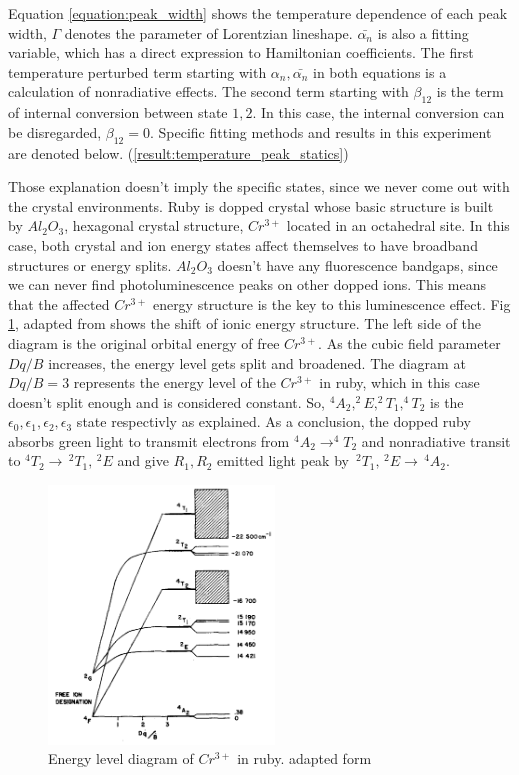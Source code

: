 \documentclass{article}
\begin{document}
 Equation \ref{equation:peak_width} shows the temperature dependence of each peak width, $\Gamma$ denotes the parameter of Lorentzian lineshape.
 $\bar{\alpha_n}$ is also a fitting variable, which has a direct expression to Hamiltonian coefficients.
 The first temperature perturbed term starting with $\alpha_n, \bar{\alpha_n}$ in both equations is a calculation of nonradiative effects.
 The second term starting with $\beta_{12}$ is the term of internal conversion between state $1,2$.
 In this case, the internal conversion can be disregarded, $\beta_{12}=0$.
 Specific fitting methods and results in this experiment are denoted below. (\ref{result:temperature_peak_statics})

 Those explanation doesn't imply the specific states, since we never come out with the crystal environments.
 Ruby is dopped crystal whose basic structure is built by $Al_2O_3$, hexagonal crystal structure, $Cr^{3+}$ located in an octahedral site.
 In this case, both crystal and ion energy states affect themselves to have broadband structures or energy splits.
 $Al_2 O_3$ doesn't have any fluorescence bandgaps, since we can never find photoluminescence peaks on other dopped ions.
 This means that the affected $Cr^{3+}$ energy structure is the key to this luminescence effect.
 Fig \ref{fig:ruby_band_structure}, adapted from \cite{Ruby_band_structure} shows the shift of ionic energy structure.
 The left side of the diagram is the original orbital energy of free $Cr^{3+}$.
 As the cubic field parameter $Dq/B$ increases, the energy level gets split and broadened.
 The diagram at $Dq/B=3$ represents the energy level of the $Cr^{3+}$ in ruby, which in this case doesn't split enough and is considered constant.
 So, $^4A_2 , ^2E, ^2T_1 , ^4T_2$ is the $\epsilon_0, \epsilon_1, \epsilon_2, \epsilon_3$ state respectivly as explained.
 As a conclusion, the dopped ruby absorbs green light to transmit electrons from $^4A_2 \rightarrow ^4T_2$ and nonradiative transit to $^4T_2 \rightarrow \,^2 T_1, \,^2E$ and give $R_1, R_2$ emitted light peak by $\,^2T_1, \,^2E \rightarrow \,^4A_2$. 

 \begin{figure}[ht]
  \centering
  \includegraphics[width=6cm]{../results/ruby_band_diagram.png}
  \caption{Energy level diagram of $Cr^{3+}$ in ruby. adapted form \cite{Ruby_band_structure}}
  \label{fig:ruby_band_structure}
\end{figure}
\end{document}
